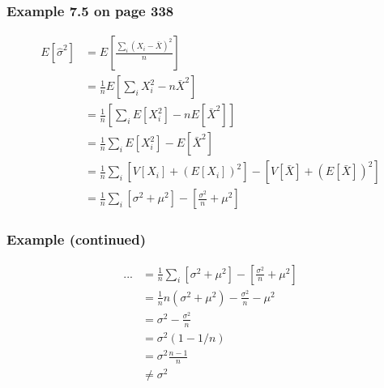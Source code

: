 \documentclass{beamer}
\begin{document}

\begin{frame}
\frametitle{Example 7.5 on page 338}

\begin{align*}
E[\hat{\sigma}^2] &= E \left[\frac{\sum_i (X_i - \bar{X})^2 }{n} \right] \\
&= \frac{1}{n} E \left[ \sum_i X_i^2 - n \bar{X}^2  \right] \\
&= \frac{1}{n} \left[  \sum_i E[X_i^2] - n E[\bar{X}^2]   \right] \\
&= \frac{1}{n} \sum_i E[X_i^2] -  E[\bar{X}^2] \\
&= \frac{1}{n} \sum_i \left[ V[X_i] + (E[X_i])^2 \right] - \left[ V[\bar{X}] + (E[\bar{X}])^2\right] \\
&= \frac{1}{n} \sum_i \left[ \sigma^2 + \mu^2 \right] - \left[ \frac{\sigma^2}{n} +  \mu^2 \right] 
\end{align*}


\end{frame}



\begin{frame}
\frametitle{Example (continued)}

\begin{align*}
... &= \frac{1}{n} \sum_i \left[ \sigma^2 + \mu^2 \right] - \left[ \frac{\sigma^2}{n} +  \mu^2 \right] \\
&= \frac{1}{n}n(\sigma^2 + \mu^2) - \frac{\sigma^2}{n} -  \mu^2 \\
&= \sigma^2  - \frac{\sigma^2}{n} \\ 
&= \sigma^2 (1 - 1/n) \\
&= \sigma^2 \frac{n-1}{n} \\
&\neq \sigma^2
\end{align*}

\end{frame}

\end{document}
